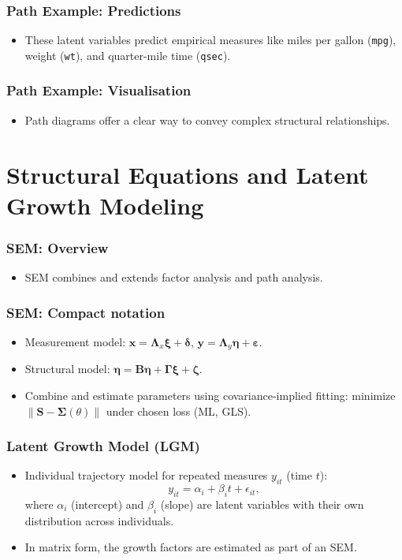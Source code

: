 \documentclass{beamer}
\begin{document}
\begin{frame}
    \frametitle{Path Example: Predictions}
    \begin{itemize}
        \item These latent variables predict empirical measures like miles per gallon (\texttt{mpg}), weight (\texttt{wt}), and quarter-mile time (\texttt{qsec}).
    \end{itemize}
\end{frame}

\begin{frame}
    \frametitle{Path Example: Visualisation}
    \begin{itemize}
        \item Path diagrams offer a clear way to convey complex structural relationships.
    \end{itemize}
\end{frame}

\section{Structural Equations and Latent Growth Modeling}
\begin{frame}
    \frametitle{SEM: Overview}
    \begin{itemize}
        \item SEM combines and extends factor analysis and path analysis.
    \end{itemize}
\end{frame}

\begin{frame}
    \frametitle{SEM: Compact notation}
    \begin{itemize}
        \item Measurement model: $\mathbf{x}=\mathbf{\Lambda}_x\mathbf{\xi}+\boldsymbol{\delta}$, $\mathbf{y}=\mathbf{\Lambda}_y\mathbf{\eta}+\boldsymbol{\varepsilon}$.
        \item Structural model: $\mathbf{\eta}=\mathbf{B}\mathbf{\eta}+\mathbf{\Gamma}\mathbf{\xi}+\boldsymbol{\zeta}$.
        \item Combine and estimate parameters using covariance-implied fitting: minimize $\|\mathbf{S}-\boldsymbol{\Sigma}(\theta)\|$ under chosen loss (ML, GLS).
    \end{itemize}
\end{frame}

\begin{frame}
    \frametitle{Latent Growth Model (LGM)}
    \begin{itemize}
        \item Individual trajectory model for repeated measures $y_{it}$ (time $t$):
        \[y_{it}=\alpha_i+\beta_i t+\epsilon_{it},\]
        where $\alpha_i$ (intercept) and $\beta_i$ (slope) are latent variables with their own distribution across individuals.
        \item In matrix form, the growth factors are estimated as part of an SEM.
    \end{itemize}
\end{frame}
\end{document}
